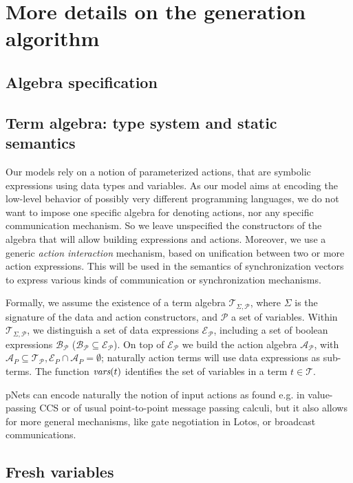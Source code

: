 \documentclass{lncs/llncs}
\def\AlgT{\mathcal{T}}
\renewcommand{\P}{\mathcal P}
\begin{document}
\appendix

\section{More details on the generation algorithm}
\subsection{Algebra specification}
\subsection{Term algebra: type system and static semantics}
Our models rely on a notion of parameterized actions, that are
symbolic expressions using data types and variables. As our model aims
at encoding the low-level behavior of possibly very different
programming languages, we do not want to impose one specific algebra
for denoting actions, nor any specific communication mechanism. So we
leave unspecified the constructors of the algebra that will allow building
expressions and actions. Moreover, we use a generic {\em action interaction}
mechanism, based on unification between two or more action
expressions. This will be used in the semantics of synchronization
vectors to express various kinds of communication or synchronization mechanisms.

\def\Talg{\mathcal{T}_{\Sigma,\P}}
Formally, we assume the existence of a term algebra $\Talg$,
where $\Sigma$ is the signature of the data and action constructors,
and $\P$ a set of variables. Within $\Talg$, we distinguish a set of
data expressions $\mathcal{E}_\P$, including a set of boolean
expressions $\mathcal{B}_{\P}$ ($\mathcal{B}_{\P}\subseteq\mathcal{E}_\P$).
On top of $\mathcal{E}_\P$ we build the action algebra
$\mathcal{A}_\P$, with $\mathcal{A}_P\subseteq\mathcal{T}_\P,
\mathcal{E}_P\cap\mathcal{A}_P=\emptyset$;
naturally action terms will use data expressions as sub-terms.
The function $\vars(t)$ identifies the set of variables in a term
$t\in\AlgT$.


pNets can encode naturally the notion of input actions as found e.g. in value-passing CCS
\cite{Milner89} or of usual point-to-point message passing calculi, but it also allows
for more general mechanisms, like gate negotiation in Lotos, or broadcast
communications.

\subsection{Fresh variables}
\end{document}
